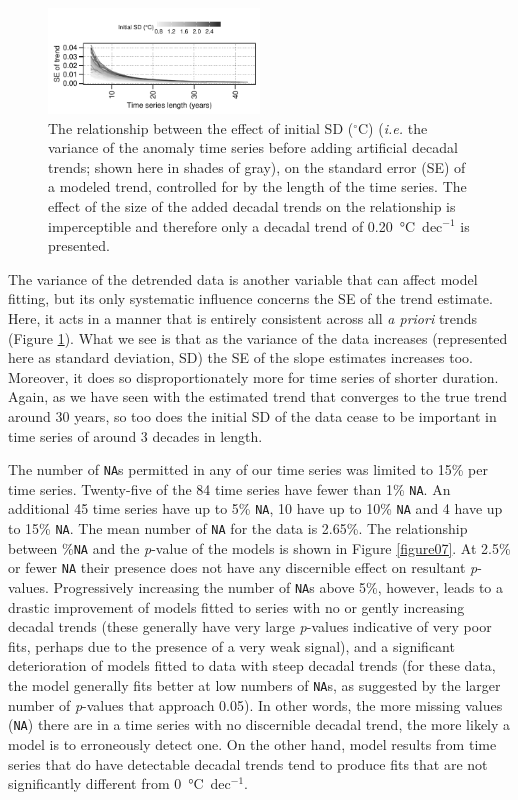\documentclass[twocol]{ametsoc}
\begin{document}
\begin{figure}
\centering \includegraphics[width=0.50\textwidth]{figure06}
\caption{The relationship between the effect of initial SD ($^{\circ}$C) (\emph{i.e.} the variance of the anomaly time series before adding artificial decadal trends; shown here in shades of gray), on the standard error (SE) of a modeled trend, controlled for by the length of the time series. The effect of the size of the added decadal trends on the relationship is imperceptible and therefore only a decadal trend of \SI{0.20}{\degreeCelsius}~dec$^{-1}$ is presented.}
\label{figure06}
\end{figure}

The variance of the detrended data is another variable that can affect model fitting, but its only systematic influence concerns the SE of the trend estimate. Here, it acts in a manner that is entirely consistent across all \emph{a priori} trends (Figure \ref{figure06}). What we see is that as the variance of the data increases (represented here as standard deviation, SD) the SE of the slope estimates increases too. Moreover, it does so disproportionately more for time series of shorter duration. Again, as we have seen with the estimated trend that converges to the true trend around 30 years, so too does the initial SD of the data cease to be important in time series of around 3 decades in length.

The number of \texttt{NA}s permitted in any of our time series was limited to 15\% per time series. Twenty-five of the 84 time series have fewer than 1\% \texttt{NA}. An additional 45 time series have up to 5\% \texttt{NA}, 10 have up to 10\% \texttt{NA} and 4 have up to 15\% \texttt{NA}. The mean number of \texttt{NA} for the data is 2.65\%. The relationship between \%\texttt{NA} and the \emph{p}-value of the models is shown in Figure \ref{figure07}. At 2.5\% or fewer \texttt{NA} their presence does not have any discernible effect on resultant \emph{p}-values. Progressively increasing the number of \texttt{NA}s above 5\%, however, leads to a drastic improvement of models fitted to series with no or gently increasing decadal trends (these generally have very large \emph{p}-values indicative of very poor fits, perhaps due to the presence of a very weak signal), and a significant deterioration of models fitted to data with steep decadal trends (for these data, the model generally fits better at low numbers of \texttt{NA}s, as suggested by the larger number of \emph{p}-values that approach 0.05). In other words, the more missing values (\texttt{NA}) there are in a time series with no discernible decadal trend, the more likely a model is to erroneously detect one. On the other hand, model results from time series that do have detectable decadal trends tend to produce fits that are not significantly different from \SI{0}{\degreeCelsius}~dec$^{-1}$.
\end{document}
